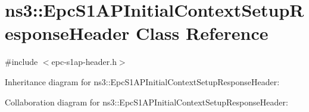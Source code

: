 \hypertarget{classns3_1_1EpcS1APInitialContextSetupResponseHeader}{}\section{ns3\+:\+:Epc\+S1\+A\+P\+Initial\+Context\+Setup\+Response\+Header Class Reference}
\label{classns3_1_1EpcS1APInitialContextSetupResponseHeader}


{\ttfamily \#include $<$epc-\/s1ap-\/header.\+h$>$}



Inheritance diagram for ns3\+:\+:Epc\+S1\+A\+P\+Initial\+Context\+Setup\+Response\+Header\+:


Collaboration diagram for ns3\+:\+:Epc\+S1\+A\+P\+Initial\+Context\+Setup\+Response\+Header\+:
